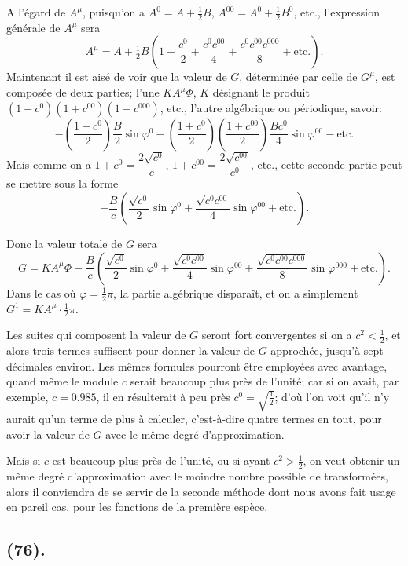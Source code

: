 \documentclass{article}
\begin{document}
A l'égard de $A^{\mu}$, puisqu'on a $A^{0}=A+\frac{1}{2}B$, $A^{00}=A^{0}+\frac{1}{2}B^{0}$, etc., l'expression générale de $A^{\mu}$ sera
\[ A^{\mu}=A+\tfrac{1}{2}B\left(1+\frac{c^{0}}{2}+\frac{c^{0}c^{00}}{4}+\frac{c^{0}c^{00}c^{000}}{8}+\text{etc.}\right). \]
Maintenant il est aisé de voir que la valeur de $G$, déterminée par celle de $G^{\mu}$, est composée de deux parties; l'une $KA^{\mu}\Phi$, $K$ désignant le produit $(1+c^{0})(1+c^{00})(1+c^{000})$, etc., l'autre algébrique ou périodique, savoir:
\[ -\left(\frac{1+c^{0}}{2}\right)\frac{B}{2}\sin\varphi^{0}-\left(\frac{1+c^{0}}{2}\right)\left(\frac{1+c^{00}}{2}\right)\frac{Bc^{0}}{4}\sin\varphi^{00}-\text{etc.} \]
Mais comme on a $1+c^{0}=\dfrac{2\sqrt{c^{0}}}{c}$, $1+c^{00}=\dfrac{2\sqrt{c^{00}}}{c^{0}}$, etc., cette seconde partie peut se mettre sous la forme
\[ -\frac{B}{c}\left(\frac{\sqrt{c^{0}}}{2}\sin\varphi^{0}+\frac{\sqrt{c^{0}c^{00}}}{4}\sin\varphi^{00}+\text{etc.}\right). \]

Donc la valeur totale de $G$ sera
\[ G=KA^{\mu}\Phi-\frac{B}{c}\left(\frac{\sqrt{c^{0}}}{2}\sin\varphi^{0}+\frac{\sqrt{c^{0}c^{00}}}{4}\sin\varphi^{00}+\frac{\sqrt{c^{0}c^{00}c^{000}}}{8}\sin\varphi^{000}+\text{etc.}\right). \]
Dans le cas où $\varphi=\frac{1}{2}\pi$, la partie algébrique disparaît, et on a simplement $G^{1}=KA^{\mu}\cdot\frac{1}{2}\pi$.

Les suites qui composent la valeur de $G$ seront fort convergentes si on a $c^{2}<\frac{1}{2}$, et alors trois termes suffisent pour donner la valeur de $G$ approchée, jusqu'à sept décimales environ. Les mêmes formules pourront être employées avec avantage, quand même le module $c$ serait beaucoup plus près de l'unité; car si on avait, par exemple, $c=0.985$, il en résulterait à peu près $c^{0}=\sqrt{\frac{1}{2}}$; d'où l'on voit qu'il n'y aurait qu'un terme de plus à calculer, c'est-à-dire quatre termes en tout, pour avoir la valeur de $G$ avec le même degré d'approximation.

Mais si $c$ est beaucoup plus près de l'unité, ou si ayant $c^{2}>\frac{1}{2}$, on veut obtenir un même degré d'approximation avec le moindre nombre possible de transformées, alors il conviendra de se servir de la seconde méthode dont nous avons fait usage en pareil cas, pour les fonctions de la première espèce.

\subsection*{(76).}
\end{document}
